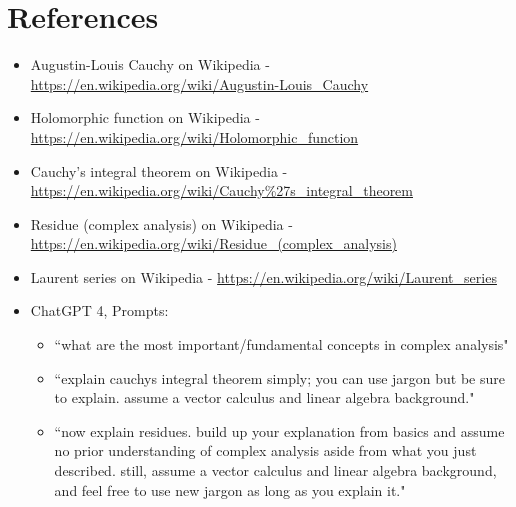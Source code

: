 \documentclass{article}
\begin{document}
\section*{References}
\begin{itemize}
    \item Augustin-Louis Cauchy on Wikipedia - \url{https://en.wikipedia.org/wiki/Augustin-Louis_Cauchy}
    \item Holomorphic function on Wikipedia - \url{https://en.wikipedia.org/wiki/Holomorphic_function}
    \item Cauchy's integral theorem on Wikipedia - \url{https://en.wikipedia.org/wiki/Cauchy%27s_integral_theorem}
    \item Residue (complex analysis) on Wikipedia - \url{https://en.wikipedia.org/wiki/Residue_(complex_analysis)}
    \item Laurent series on Wikipedia - \url{https://en.wikipedia.org/wiki/Laurent_series}
    \item ChatGPT 4, Prompts:
    \begin{itemize}
        \item ``what are the most important/fundamental concepts in complex analysis"
        \item ``explain cauchys integral theorem simply; you can use jargon but be sure to explain. assume a vector calculus and linear algebra background."
        \item ``now explain residues. build up your explanation from basics and assume no prior understanding of complex analysis aside from what you just described. still, assume a vector calculus and linear algebra background, and feel free to use new jargon as long as you explain it."
    \end{itemize}
\end{itemize}
\end{document}
